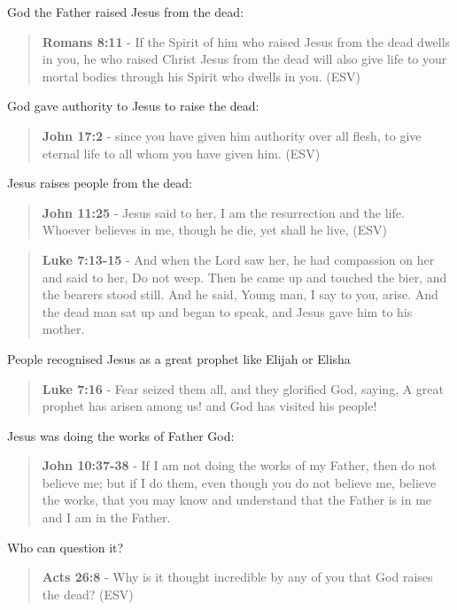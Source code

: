 \documentclass[11pt]{article}
\begin{document}
God the Father raised Jesus from the dead:

\begin{quote}
\textbf{Romans 8:11} - If the Spirit of him who raised Jesus from the dead dwells in you, he who raised Christ Jesus from the dead will also give life to your mortal bodies through his Spirit who dwells in you. (ESV)
\end{quote}

God gave authority to Jesus to raise the dead:

\begin{quote}
\textbf{John 17:2} - since you have given him authority over all flesh, to give eternal life to all whom you have given him. (ESV)
\end{quote}

Jesus raises people from the dead:

\begin{quote}
\textbf{John 11:25} - Jesus said to her, I am the resurrection and the life. Whoever believes in me, though he die, yet shall he live, (ESV)
\end{quote}

\begin{quote}
\textbf{Luke 7:13-15} - And when the Lord saw her, he had compassion on her and said to her, Do not weep. Then he came up and touched the bier, and the bearers stood still. And he said, Young man, I say to you, arise. And the dead man sat up and began to speak, and Jesus gave him to his mother.
\end{quote}

People recognised Jesus as a great prophet like Elijah or Elisha

\begin{quote}
\textbf{Luke 7:16} - Fear seized them all, and they glorified God, saying, A great prophet has arisen among us! and God has visited his people!
\end{quote}

Jesus was doing the works of Father God:

\begin{quote}
\textbf{John 10:37-38} - If I am not doing the works of my Father, then do not believe me; but if I do them, even though you do not believe me, believe the works, that you may know and understand that the Father is in me and I am in the Father.
\end{quote}

Who can question it?

\begin{quote}
\textbf{Acts 26:8} -  Why is it thought incredible by any of you that God raises the dead?  (ESV)
\end{quote}
\end{document}
